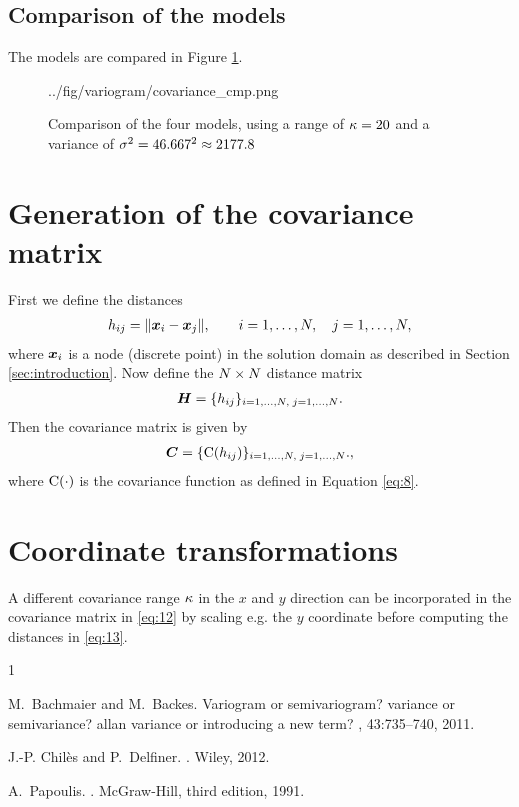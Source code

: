 \documentclass[11pt,a4paper]{amsart}
\newenvironment{ovpc}[2]{\begin{overpic}[width=#1\textwidth]{../fig/#2}}{\end{overpic}}
\begin{document}
\subsection{Comparison of the models}
The models are compared in Figure \ref{fig:cov}.
\begin{figure}
  \centering
  \begin{ovpc}{.8}{variogram/covariance_cmp.png}
  \end{ovpc}
  \caption{Comparison of the four models, using a range of $\kappa = 20$ and a
    variance of $\sigma^2 = 46.667^2 \approx 2177.8$ }
  \label{fig:cov}
\end{figure}
\section{Generation of the covariance matrix}
First we define the distances
\begin{align}
  \label{eq:13}
  h_{ij} = \| \boldsymbol{x}_i - \boldsymbol{x}_j \|, \qquad
  i=1,\ldots, N, \quad j=1,\ldots,N,
\end{align}
where $\boldsymbol{x}_i$ is a node (discrete point) in the solution domain as
described in Section \ref{sec:introduction}.
Now define the $N \times N$ distance matrix
\begin{align}
  \label{eq:14}
  \boldsymbol{H} = \{ h_{ij} \}_{i=1,\ldots,N, \; j=1,
  \ldots, N}.
\end{align}
Then the covariance matrix is given by
\begin{align}
  \label{eq:12}
  \boldsymbol{C} = \{ \operatorname{C}(h_{ij})
  \}_{i=1,\ldots,N, \; j=1,  
  \ldots, N}.
,
\end{align}
where $\operatorname{C}(\cdot)$ is the covariance function as defined in
Equation \eqref{eq:8}.
\section{Coordinate transformations}
A different covariance range $\kappa$ in the $x$ and $y$ direction can be
incorporated in the covariance matrix in \eqref{eq:12} by scaling e.g. the $y$
coordinate before computing the distances in \eqref{eq:13}.


\begin{thebibliography}{1}

M.~Bachmaier and M.~Backes.
\newblock Variogram or semivariogram? variance or semivariance? allan variance
  or introducing a new term?
, 43:735--740, 2011.

J.-P. Chil{\`{e}}s and P.~Delfiner.
.
\newblock Wiley, 2012.

A.~Papoulis.
.
\newblock McGraw-Hill, third edition, 1991.

\end{thebibliography}
\end{document}
